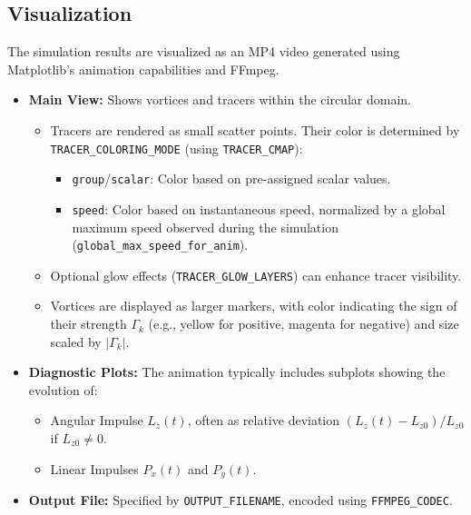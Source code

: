 \documentclass[12pt,letterpaper]{article}
\newcommand{\vortstrength}{\Gamma}
\begin{document}
\subsection{Visualization}
The simulation results are visualized as an MP4 video generated using Matplotlib's animation capabilities and FFmpeg.
\begin{itemize}
    \item \textbf{Main View:} Shows vortices and tracers within the circular domain.
        \begin{itemize}
            \item Tracers are rendered as small scatter points. Their color is determined by \\ \texttt{TRACER\_COLORING\_MODE} (using \texttt{TRACER\_CMAP}):
                \begin{itemize}
                    \item \texttt{group}/\texttt{scalar}: Color based on pre-assigned scalar values.
                    \item \texttt{speed}: Color based on instantaneous speed, normalized by a global maximum speed observed during the simulation (\texttt{global\_max\_speed\_for\_anim}).
                \end{itemize}
            \item Optional glow effects (\texttt{TRACER\_GLOW\_LAYERS}) can enhance tracer visibility.
            \item Vortices are displayed as larger markers, with color indicating the sign of their strength $\vortstrength_k$ (e.g., yellow for positive, magenta for negative) and size scaled by $|\vortstrength_k|$.
        \end{itemize}
    \item \textbf{Diagnostic Plots:} The animation typically includes subplots showing the evolution of:
        \begin{itemize}
            \item Angular Impulse $L_z(t)$, often as relative deviation $(L_z(t) - L_{z0})/L_{z0}$ if $L_{z0} \neq 0$.
            \item Linear Impulses $P_x(t)$ and $P_y(t)$.
        \end{itemize}
    \item \textbf{Output File:} Specified by \texttt{OUTPUT\_FILENAME}, encoded using \texttt{FFMPEG\_CODEC}.
\end{itemize}
\end{document}

